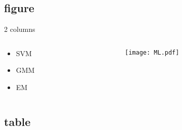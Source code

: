 \documentclass[UTF8, aspectratio=169 , 10pt，punct=kaiming]{beamer} %
\begin{document}
\subsection{figure}


\begin{frame}{ 2 columns }
  \begin{columns}
    \begin{column}{.15\textwidth}
      \begin{itemize}
        \item SVM
        \item GMM 
        \item EM
      \end{itemize}
    \end{column}
    \begin{column}{.8\textwidth}
      \begin{figure}[h]
        \centering
        \texttt{[image: ML.pdf]}
      \end{figure}
    \end{column}
  \end{columns}
\end{frame}



\subsection{table}
\end{document}

